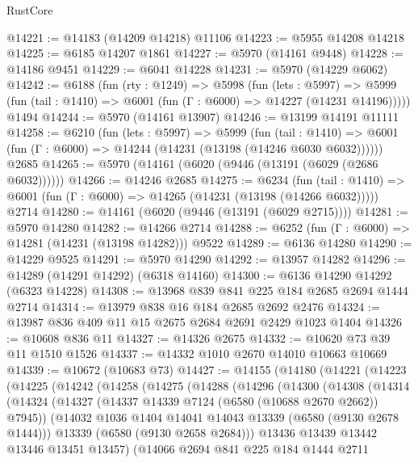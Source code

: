 \begin{lexlean}{RustCore}
\begin{coremodule}
{\begin{coremodule}
{{{{{{{{{{{{{{{{{{{{{{{{{{{{{{{{{{{{{{{{{{{{{@14221 := @14183 (@14209 @14218) @11106
@14223 := @5955 @14208 @14218
@14225 := @6185 @14207 @1861
@14227 := @5970 (@14161 @9448)
@14228 := @14186 @9451
@14229 := @6041 @14228
@14231 := @5970 (@14229 @6062)
@14242 := @6188
    (fun (rty : @1249) =>
    @5998
      (fun (lets : @5997) =>
      @5999 (fun (tail : @1410) => @6001 (fun (Γ : @6000) => @14227 (@14231 @14196)))))
    @1494
@14244 := @5970 (@14161 @13907)
@14246 := @13199 @14191 @11111
@14258 := @6210
    (fun (lets : @5997) =>
    @5999
      (fun (tail : @1410) =>
      @6001 (fun (Γ : @6000) => @14244 (@14231 (@13198 (@14246 @6030 @6032))))))
    @2685
@14265 := @5970 (@14161 (@6020 (@9446 (@13191 (@6029 (@2686 @6032))))))
@14266 := @14246 @2685
@14275 := @6234
    (fun (tail : @1410) => @6001 (fun (Γ : @6000) => @14265 (@14231 (@13198 (@14266 @6032)))))
    @2714
@14280 := @14161 (@6020 (@9446 (@13191 (@6029 @2715))))
@14281 := @5970 @14280
@14282 := @14266 @2714
@14288 := @6252 (fun (Γ : @6000) => @14281 (@14231 (@13198 @14282))) @9522
@14289 := @6136 @14280
@14290 := @14229 @9525
@14291 := @5970 @14290
@14292 := @13957 @14282
@14296 := @14289 (@14291 @14292) (@6318 @14160)
@14300 := @6136 @14290 @14292 (@6323 @14228)
@14308 := @13968 @839 @841 @225 @184 @2685 @2694 @1444 @2714
@14314 := @13979 @838 @16 @184 @2685 @2692 @2476
@14324 := @13987 @836 @409 @11 @15 @2675 @2684 @2691 @2429 @1023 @1404
@14326 := @10608 @836 @11
@14327 := @14326 @2675
@14332 := @10620 @73 @39 @11 @1510 @1526
@14337 := @14332 @1010 @2670 @14010 @10663 @10669
@14339 := @10672 (@10683 @73)
@14427 := @14155
    (@14180
      (@14221
        (@14223
          (@14225
            (@14242
              (@14258
                (@14275
                  (@14288
                    (@14296
                      (@14300
                        (@14308
                          (@14314
                            (@14324
                              (@14327 (@14337 @14339 @7124 (@6580 (@10688 @2670 @2662)) @7945))
                              (@14032 @1036 @1404 @14041 @14043 @13339 (@6580 (@9130 @2678 @1444)))
                              @13339
                              (@6580 (@9130 @2658 @2684)))
                            @13436
                            @13439
                            @13442
                            @13446
                            @13451
                            @13457)
                          (@14066
                            @2694
                            @841
                            @225
                            @184
                            @1444
                            @2711
}}}}}}}}}}}}}}}}}}}}}}}}}}}}}}}}}}}}}}}}}}}}}
\end{coremodule}}
\end{coremodule}
\end{lexlean}
